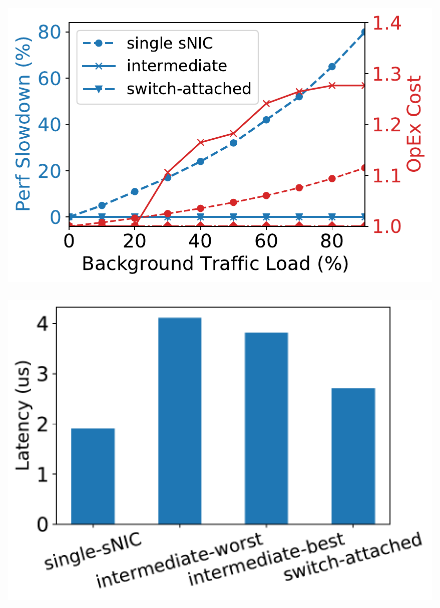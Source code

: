 {\begin{figure}[th]
\begin{minipage}{\figWidthSix}
\begin{center}
{
}
\end{center}
\end{minipage}
\begin{minipage}{\figWidthSix}
\begin{center}
\centerline{\includegraphics[width=\columnwidth]{Figures/fig-dist-nic-load-increase.pdf}}
\vspace{-0.1in}
{
}
\end{center}
\end{minipage}
\begin{minipage}{\figWidthSix}
\begin{center}
\centerline{\includegraphics[width=\columnwidth]{Figures/fig-dist-nic-latency.pdf}}
\vspace{-0.1in}
{
}
\end{center}
\end{minipage}
\vspace{-0.1in}
\end{figure}
}